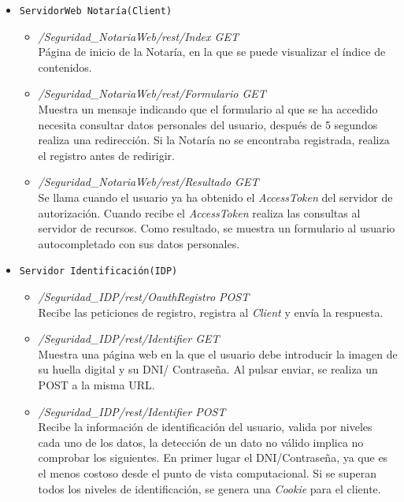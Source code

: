 \documentclass[a4,12pt,onecolum]{article}
\begin{document}
\begin{itemize}
\item \texttt{ServidorWeb Notaría(Client)}
	\begin{itemize}
		\item \emph{/Seguridad\_NotariaWeb/rest/Index	GET} \\
		Página de inicio de la Notaría, en la que se puede visualizar el índice de contenidos.

		\item \emph{/Seguridad\_NotariaWeb/rest/Formulario	GET} \\
		Muestra un mensaje indicando que el formulario al que se ha accedido necesita consultar datos 					personales del usuario, después de 5 segundos realiza una redirección. Si la Notaría no se encontraba 			registrada, realiza el registro antes de redirigir.

		\item \emph{/Seguridad\_NotariaWeb/rest/Resultado	GET} \\
		Se llama cuando el usuario ya ha obtenido el \emph{AccessToken} del servidor de autorización. Cuando 			recibe el \emph{AccessToken} realiza las consultas al servidor de recursos. Como resultado, se muestra 			un formulario al usuario autocompletado con sus datos personales.
	\end{itemize}

\item \texttt{Servidor Identificación(IDP)}
	\begin{itemize}
		\item \emph{/Seguridad\_IDP/rest/OauthRegistro	POST} \\
		Recibe las peticiones de registro, registra al \emph{Client} y envía la respuesta.

		\item \emph{/Seguridad\_IDP/rest/Identifier	GET} \\
		Muestra una página web en la que el usuario debe introducir la imagen de su huella digital y su DNI/			Contraseña. Al pulsar enviar, se realiza un POST a la misma URL.

		\item \emph{/Seguridad\_IDP/rest/Identifier	POST} \\
		Recibe la información de identificación del usuario, valida por niveles cada uno de los datos, la 				detección de un dato no válido implica no comprobar los siguientes. En primer lugar el DNI/Contraseña, 			ya que es el menos costoso desde el punto de vista computacional.
		Si se superan todos los niveles de identificación, se genera una \emph{Cookie} para el cliente.


\end{itemize}
\end{itemize}
\end{document}
